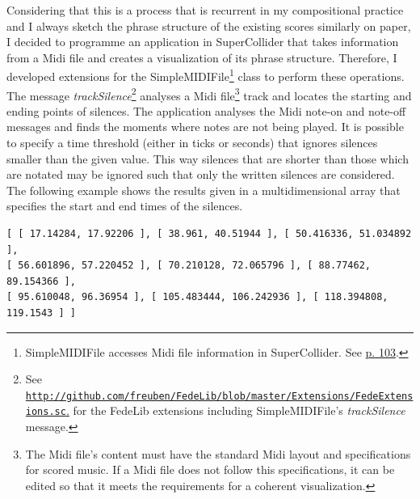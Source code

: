 Considering that this is a process that is recurrent in my compositional practice and I always sketch the phrase structure of the existing scores similarly on paper, I decided to programme an application in SuperCollider that takes information from a Midi file and creates a visualization of its phrase structure. Therefore, I developed extensions for the SimpleMIDIFile\footnote{SimpleMIDIFile accesses Midi file information in SuperCollider. See \hyperlink{wlib}{p. 103}.} class to perform these operations. The message \emph{trackSilence}\footnote{See \href{http://github.com/freuben/FedeLib/blob/master/Extensions/FedeExtensions.sc}{\texttt{http://github.com/freuben/FedeLib/blob/master/Extensions/FedeExtensions.sc}.} for the FedeLib extensions including SimpleMIDIFile's \emph{trackSilence} message.} analyses a Midi file\footnote{The Midi file's content must have the standard Midi layout and specifications for scored music. If a Midi file does not follow this specifications, it can be edited so that it meets the requirements for a coherent visualization.} track and locates the starting and ending points of silences. The application analyses the Midi note-on and note-off messages and finds the moments where notes are not being played. It is possible to specify a time threshold (either in ticks or seconds) that ignores silences smaller than the given value. This way silences that are shorter than those which are notated may be ignored such that only the written silences are considered. The following example shows  the results given in a multidimensional array that specifies the start and end times of the silences.
\begin{verbatim}
[ [ 17.14284, 17.92206 ], [ 38.961, 40.51944 ], [ 50.416336, 51.034892 ], 
[ 56.601896, 57.220452 ], [ 70.210128, 72.065796 ], [ 88.77462, 89.154366 ], 
[ 95.610048, 96.36954 ], [ 105.483444, 106.242936 ], [ 118.394808, 119.1543 ] ]
\end{verbatim}

